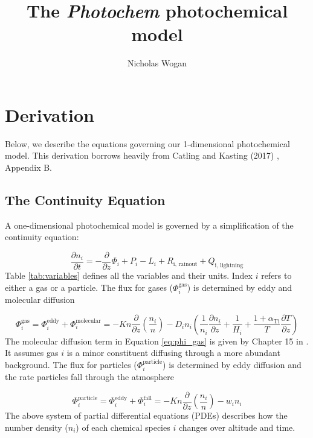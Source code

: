 \documentclass{article}
\begin{document}
\title{The \emph{Photochem} photochemical model}
\author{Nicholas Wogan}
\maketitle

\section{Derivation}
\label{sec:methods}

Below, we describe the equations governing our 1-dimensional photochemical model. This derivation borrows heavily from Catling and Kasting (2017) \citep{Catling_2017}, Appendix B.


\subsection{The Continuity Equation}
A one-dimensional photochemical model is governed by a simplification of the continuity equation:

\begin{equation} \label{eq:continuity}
\frac{\partial n_{i}}{\partial t} = - \frac{\partial}{\partial z}\Phi_{i} + P_{i} - L_{i} + R_{\text{i,\ rainout}} + Q_{\text{i,\ lightning}}
\end{equation}
Table \ref{tab:variables} defines all the variables and their
units. Index $i$ refers to either a gas or a particle. The flux for gases ($\Phi_{i}^\text{gas}$) is determined by eddy and molecular diffusion

\begin{equation} \label{eq:phi_gas}
\Phi_{i}^\text{gas} = \Phi_{i}^\mathrm{eddy} + \Phi_{i}^\mathrm{molecular} = - Kn\frac{\partial}{\partial z}\left( \frac{n_{i}}{n} \right) - D_{i}n_{i}\left( \frac{1}{n_{i}}\frac{\partial n_{i}}{\partial z} + \frac{1}{H_{i}} + \frac{1 + \alpha_{\text{Ti}}}{T}\frac{\partial T}{\partial z} \right)
\end{equation}
The molecular diffusion term in Equation \eqref{eq:phi_gas} is given by Chapter 15 in \cite{Banks_2013}. It assumes gas $i$ is a minor constituent diffusing through a more abundant background. The flux for particles ($\Phi_{i}^\text{particle}$) is determined by eddy diffusion and the rate particles fall through the atmosphere

\begin{equation} \label{eq:phi_particle}
  \Phi_{i}^\text{particle} = \Phi_{i}^\mathrm{eddy} + \Phi_{i}^\mathrm{fall} = - Kn\frac{\partial}{\partial z}\left( \frac{n_{i}}{n} \right) - w_i n_i
\end{equation}
The above system of partial differential equations (PDEs) describes how the number density ($n_{i}$) of each chemical species $i$ changes over altitude and time.
\end{document}
